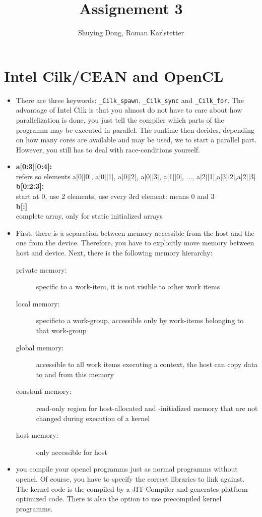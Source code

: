 \documentclass[a4paper,10pt]{article}
\title{Assignement 3}
\author{Shuying Dong, Roman Karlstetter}
\begin{document}
\section{Intel Cilk/CEAN and OpenCL}
\begin{itemize}
 \item There are three keywords: \texttt{\_Cilk\_spawn}, \texttt{\_Cilk\_sync} and \texttt{\_Cilk\_for}. The advantage of Intel Cilk is that you almost do not have to care about how parallelization is done, you just tell the compiler which parts of the programm may be executed in parallel. The runtime then decides, depending on how many cores are available and may be used, we to start a parallel part. However, you still has to deal with race-conditions yourself.
\item
\textbf{a[0:3][0:4]:} \\ refers so elements a[0][0], a[0][1], a[0][2], a[0][3], a[1][0], ..., a[2][1],a[3][2],a[2][3] \\
\textbf{b[0:2:3]:}    \\ start at 0, use 2 elements, use every 3rd element: means 0 and 3\\
\textbf{b[:]}  \\ complete array, only for static initialized arrays\\
\item
First, there is a separation between memory accessible from the host and the one from the device. Therefore, you have to explicitly move memory between host and device. Next, there is the following memory hierarchy:
\begin{description}
 \item [private memory: ] specific to a work-item, it is not visible to other work items
 \item[local memory: ] specificto a work-group, accessible only by work-items belonging to that work-group
 \item[global memory: ] accessible to all work items executing a context, the host can copy data to and from this memory
 \item[constant memory: ] read-only region for host-allocated and -initialized memory that are not changed during execution of a kernel
 \item[host memory: ] only accessible for host
\end{description}
\item you compile your opencl programms just as normal programms without opencl. Of course, you have to specify the correct libraries to link against. The kernel code is the compiled by a JIT-Compiler and generates platform-optimized code. There is also the option to use precompiled kernel programms.


\end{itemize}
\end{document}
